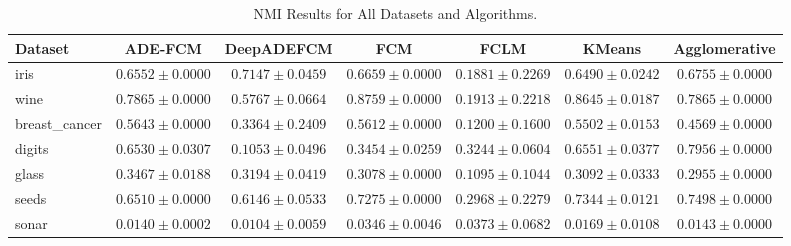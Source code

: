 \begin{table}[ht]
\centering
\caption{NMI Results for All Datasets and Algorithms.}
\label{tab:nmi}
\begin{tabular}{lcccccc}
\toprule
Dataset & ADE-FCM & DeepADEFCM & FCM & FCLM & KMeans & Agglomerative \\
\midrule
iris & $0.6552\pm0.0000$ & $0.7147\pm0.0459$ & $0.6659\pm0.0000$ & $0.1881\pm0.2269$ & $0.6490\pm0.0242$ & $0.6755\pm0.0000$ \\
wine & $0.7865\pm0.0000$ & $0.5767\pm0.0664$ & $0.8759\pm0.0000$ & $0.1913\pm0.2218$ & $0.8645\pm0.0187$ & $0.7865\pm0.0000$ \\
breast_cancer & $0.5643\pm0.0000$ & $0.3364\pm0.2409$ & $0.5612\pm0.0000$ & $0.1200\pm0.1600$ & $0.5502\pm0.0153$ & $0.4569\pm0.0000$ \\
digits & $0.6530\pm0.0307$ & $0.1053\pm0.0496$ & $0.3454\pm0.0259$ & $0.3244\pm0.0604$ & $0.6551\pm0.0377$ & $0.7956\pm0.0000$ \\
glass & $0.3467\pm0.0188$ & $0.3194\pm0.0419$ & $0.3078\pm0.0000$ & $0.1095\pm0.1044$ & $0.3092\pm0.0333$ & $0.2955\pm0.0000$ \\
seeds & $0.6510\pm0.0000$ & $0.6146\pm0.0533$ & $0.7275\pm0.0000$ & $0.2968\pm0.2279$ & $0.7344\pm0.0121$ & $0.7498\pm0.0000$ \\
sonar & $0.0140\pm0.0002$ & $0.0104\pm0.0059$ & $0.0346\pm0.0046$ & $0.0373\pm0.0682$ & $0.0169\pm0.0108$ & $0.0143\pm0.0000$ \\
\bottomrule
\end{tabular}
\end{table}

